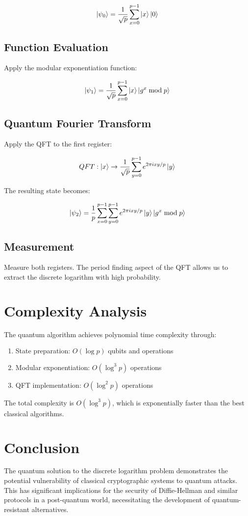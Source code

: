 \documentclass[12pt]{article}
\begin{document}
\begin{equation}
    \ket{\psi_0} = \frac{1}{\sqrt{p}} \sum_{x=0}^{p-1} \ket{x}\ket{0}
\end{equation}

\subsection{Function Evaluation}
Apply the modular exponentiation function:

\begin{equation}
    \ket{\psi_1} = \frac{1}{\sqrt{p}} \sum_{x=0}^{p-1} \ket{x}\ket{g^x \bmod p}
\end{equation}

\subsection{Quantum Fourier Transform}
Apply the QFT to the first register:

\begin{equation}
    QFT: \ket{x} \rightarrow \frac{1}{\sqrt{p}} \sum_{y=0}^{p-1} e^{2\pi ixy/p}\ket{y}
\end{equation}

The resulting state becomes:

\begin{equation}
    \ket{\psi_2} = \frac{1}{p} \sum_{x=0}^{p-1} \sum_{y=0}^{p-1} e^{2\pi ixy/p}\ket{y}\ket{g^x \bmod p}
\end{equation}

\subsection{Measurement}
Measure both registers. The period finding aspect of the QFT allows us to extract the discrete logarithm with high probability.

\section{Complexity Analysis}
The quantum algorithm achieves polynomial time complexity through:
\begin{enumerate}
    \item State preparation: $O(\log p)$ qubits and operations
    \item Modular exponentiation: $O(\log^3 p)$ operations
    \item QFT implementation: $O(\log^2 p)$ operations
\end{enumerate}

The total complexity is $O(\log^3 p)$, which is exponentially faster than the best classical algorithms.

\section{Conclusion}
The quantum solution to the discrete logarithm problem demonstrates the potential vulnerability of classical cryptographic systems to quantum attacks. This has significant implications for the security of Diffie-Hellman and similar protocols in a post-quantum world, necessitating the development of quantum-resistant alternatives.
\end{document}
